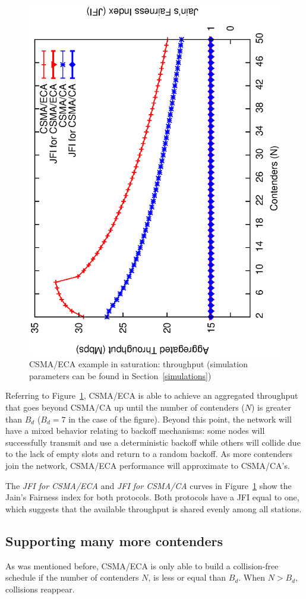 \documentclass[a4paper,journal]{IEEEtran}
\begin{document}
\begin{figure}[tb]
\centering
  \includegraphics[width=0.7\linewidth, angle=-90]{figures/DCF-vs-ECA/DCF-vs-ECA2.eps}
  \caption{CSMA/ECA example in saturation: throughput (simulation parameters can be found in Section~\ref{simulations})}
  \label{fig:BECA}
\end{figure}

Referring to Figure~\ref{fig:BECA}, CSMA/ECA is able to achieve an aggregated throughput that goes beyond CSMA/CA up until the number of contenders ($N$) is greater than $B_{d}$ ($B_{d}=7$ in the case of the figure). Beyond this point, the network will have a mixed behavior relating to backoff mechanisms: some nodes will successfully transmit and use a deterministic backoff while others will collide due to the lack of empty slots and return to a random backoff. As more contenders join the network, CSMA/ECA performance will approximate to CSMA/CA's.

The \emph{JFI for CSMA/ECA} and \emph{JFI for CSMA/CA} curves in Figure~\ref{fig:BECA} show the Jain's Fairness index for both protocols. Both protocols have a JFI equal to one, which suggests that the available throughput is shared evenly among all stations.

	\subsection{Supporting many more contenders}\label{moreContenders}
	As was mentioned before, CSMA/ECA is only able to build a collision-free schedule if the number of contenders $N$, is less or equal than $B_{d}$. When $N > B_{d}$, collisions reappear. 
	
\end{document}
